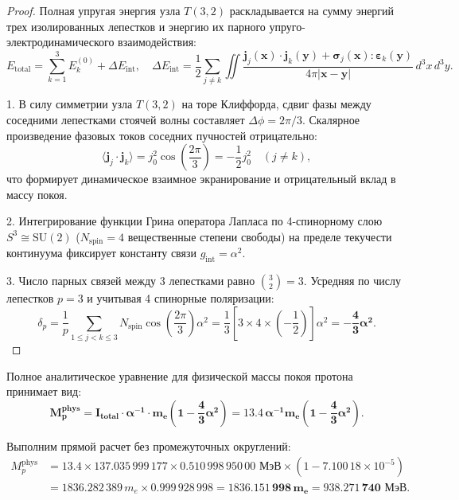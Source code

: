 \documentclass[12pt,a4paper]{article}
\begin{document}
	\begin{proof}
		Полная упругая энергия узла $T(3,2)$ раскладывается на сумму энергий трех изолированных лепестков и энергию их парного упруго-электродинамического взаимодействия:
		\begin{equation}
			E_{\text{total}} = \sum_{k=1}^3 E_k^{(0)} + \Delta E_{\text{int}}, \quad \Delta E_{\text{int}} = \frac{1}{2} \sum_{j \ne k} \iint \frac{\mathbf{j}_j(\mathbf{x}) \cdot \mathbf{j}_k(\mathbf{y}) + \boldsymbol{\sigma}_j(\mathbf{x}) : \boldsymbol{\varepsilon}_k(\mathbf{y})}{4\pi |\mathbf{x} - \mathbf{y}|} \, d^3x \, d^3y.
		\end{equation}
		
		1. В силу симметрии узла $T(3,2)$ на торе Клиффорда, сдвиг фазы между соседними лепестками стоячей волны составляет $\Delta \phi = 2\pi/3$. Скалярное произведение фазовых токов соседних пучностей отрицательно:
		\begin{equation}
			\langle \mathbf{j}_j \cdot \mathbf{j}_k \rangle = j_0^2 \cos\left(\frac{2\pi}{3}\right) = -\frac{1}{2} j_0^2 \quad (j \ne k),
		\end{equation}
		что формирует динамическое взаимное экранирование и отрицательный вклад в массу покоя.
		
		2. Интегрирование функции Грина оператора Лапласа по 4-спинорному слою $S^3 \cong \mathrm{SU}(2)$ ($N_{\text{spin}} = 4$ вещественные степени свободы) на пределе текучести континуума фиксирует константу связи $g_{\text{int}} = \alpha^2$.
		
		3. Число парных связей между 3 лепестками равно $\binom{3}{2} = 3$. Усредняя по числу лепестков $p=3$ и учитывая 4 спинорные поляризации:
		\begin{equation}
			\delta_p = \frac{1}{p} \sum_{1 \le j < k \le 3} N_{\text{spin}} \cos\left(\frac{2\pi}{3}\right) \alpha^2 = \frac{1}{3} \left[ 3 \times 4 \times \left(-\frac{1}{2}\right) \right] \alpha^2 = \mathbf{-\frac{4}{3} \alpha^2}.
		\end{equation}
	\end{proof}
		
	Полное аналитическое уравнение для физической массы покоя протона принимает вид:
	\begin{equation}
		\mathbf{M_p^{\text{phys}} = I_{\text{total}} \cdot \alpha^{-1} \cdot m_e \left( 1 - \frac{4}{3}\alpha^2 \right) = 13.4 \, \alpha^{-1} m_e \left( 1 - \frac{4}{3}\alpha^2 \right)}.
	\end{equation}
	
	Выполним прямой расчет без промежуточных округлений:
	\begin{align}
		M_p^{\text{phys}} &= 13.4 \times 137.035\,999\,177 \times 0.510\,998\,950\,00 \text{ МэВ} \times \left( 1 - 7.100\,18 \times 10^{-5} \right) \nonumber \\
		&= 1836.282\,389 \, m_e \times 0.999\,928\,998 = \mathbf{1836.151\,998 \, m_e} = \mathbf{938.271\,740 \text{ МэВ}}.
	\end{align}
	
\end{document}
